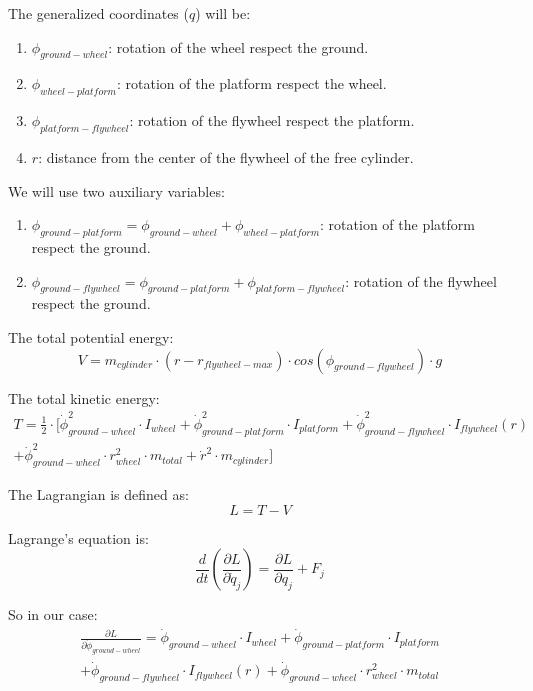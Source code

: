 The generalized coordinates ($q$) will be:
\begin{enumerate}
	\item $\phi_{ground-wheel}$: rotation of the wheel respect the ground.
	\item $\phi_{wheel-platform}$: rotation of the platform respect the wheel.
	\item $\phi_{platform-flywheel}$: rotation of the flywheel respect the platform.
	\item $r$: distance from the center of the flywheel of the free cylinder.

\end{enumerate}

We will use two auxiliary variables:
\begin{enumerate}
	\item $\phi_{ground-platform}=\phi_{ground-wheel}+\phi_{wheel-platform}$: rotation of the platform respect the ground.
	\item $\phi_{ground-flywheel}=\phi_{ground-platform}+\phi_{platform-flywheel}$: rotation of the flywheel respect the ground.
\end{enumerate}

The total potential energy:
\begin{equation}
	V = m_{cylinder}\cdot (r-r_{flywheel-max}) \cdot cos(\phi_{ground-flywheel}) \cdot g
\end{equation}


The total kinetic energy:
\begin{multline}
	T = \frac{1}{2}\cdot[\dot{\phi}_{ground-wheel}^2\cdot I_{wheel}
		+ \dot{\phi}_{ground-platform}^2 \cdot I_{platform}
		+ \dot{\phi}_{ground-flywheel}^2\cdot I_{flywheel}(r)\\
		+ \dot{\phi}_{ground-wheel}^2\cdot r_{wheel}^2\cdot m_{total}
		+ \dot{r}^2\cdot m_{cylinder}]
\end{multline}

The Lagrangian is defined as:
\begin{equation}
	L=T-V
\end{equation}

Lagrange's equation is:
\begin{equation}
	\frac{d}{dt}(\frac{\partial L}{\partial \dot{q}_j})=
	\frac{\partial L}{\partial q_j}	+ F_{j}
\end{equation}

So in our case:
\begin{multline}
	\frac{\partial L}{\partial \dot{\phi}_{ground-wheel}}=
	\dot{\phi}_{ground-wheel} \cdot I_{wheel}
	+ \dot{\phi}_{ground-platform} \cdot I_{platform}\\
	+ \dot{\phi}_{ground-flywheel}\cdot I_{flywheel}(r)
	+ \dot{\phi}_{ground-wheel}\cdot r_{wheel}^2\cdot m_{total}
\end{multline}

